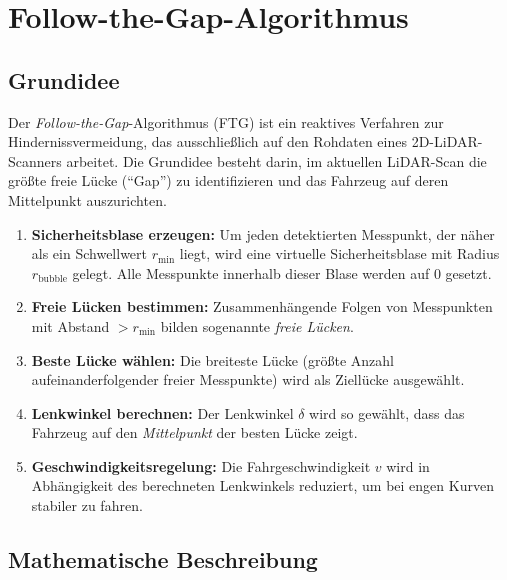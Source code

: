 \chapter{Follow-the-Gap-Algorithmus}
\label{chap:algorithmus}

\section{Grundidee}
\label{sec:ftg_idea}

Der \emph{Follow-the-Gap}-Algorithmus (FTG) ist ein reaktives
Verfahren zur Hindernissvermeidung, das ausschließlich auf den
Rohdaten eines 2D-LiDAR-Scanners arbeitet.
Die Grundidee besteht darin, im aktuellen LiDAR-Scan die größte
freie Lücke (\enquote{Gap}) zu identifizieren und das Fahrzeug
auf deren Mittelpunkt auszurichten.

\begin{enumerate}[label=\arabic*., leftmargin=*]
  \item \textbf{Sicherheitsblase erzeugen:}
        Um jeden detektierten Messpunkt, der näher als ein
        Schwellwert \(r_{\min}\) liegt, wird eine virtuelle
        Sicherheitsblase mit Radius \(r_{\text{bubble}}\) gelegt.
        Alle Messpunkte innerhalb dieser Blase werden auf
        \(0\) gesetzt.
  \item \textbf{Freie Lücken bestimmen:}
        Zusammenhängende Folgen von Messpunkten mit Abstand
        \(> r_{\min}\) bilden sogenannte \emph{freie Lücken}.
  \item \textbf{Beste Lücke wählen:}
        Die breiteste Lücke (größte Anzahl aufeinanderfolgender
        freier Messpunkte) wird als Ziellücke ausgewählt.
  \item \textbf{Lenkwinkel berechnen:}
        Der Lenkwinkel \(\delta\) wird so gewählt, dass das Fahrzeug
        auf den \emph{Mittelpunkt} der besten Lücke zeigt.
  \item \textbf{Geschwindigkeitsregelung:}
        Die Fahrgeschwindigkeit \(v\) wird in Abhängigkeit des
        berechneten Lenkwinkels reduziert, um bei engen Kurven
        stabiler zu fahren.
\end{enumerate}

\section{Mathematische Beschreibung}
\label{sec:ftg_math}

